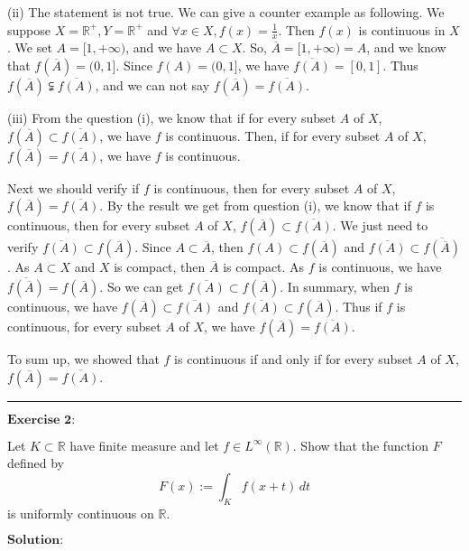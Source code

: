\documentclass[12pt,a4paper]{ctexart}
\begin{document}
(ii) The statement is not true. We can give a counter example as following. We suppose $X = \mathbb{R}^{+}, Y = \mathbb{R}^{+}$ and $\forall x \in X, f(x) = \frac{1}{x}$. Then $f(x)$ is continuous in $X$. We set $A = [1, + \infty)$, and we have $A \subset X$. So, $\overline{A} = [1, + \infty) = A$, and we know that $f(\overline{A}) = (0, 1]$. Since $f(A) = (0, 1]$, we have $\overline{f(A)} = [0, 1]$. Thus $f(\overline{A}) \subsetneqq \overline{f(A)}$, and we can not say $f(\overline{A}) = \overline{f(A)}$.

(iii) From the question (i), we know that if for every subset $A$ of $X$, $f(\overline{A}) \subset  \overline{f(A)}$, we have $f$ is continuous. Then, if for every subset $A$ of $X$, $f(\overline{A}) = \overline{f(A)}$, we have $f$ is continuous. 

Next we should verify if $f$ is continuous, then for every subset $A$ of $X$, $f(\overline{A}) = \overline{f(A)}$. By the result we get from question (i), we know that if $f$ is continuous, then for every subset $A$ of $X$, $f(\overline{A}) \subset  \overline{f(A)}$. We just need to verify $\overline{f(A)} \subset  f(\overline{A})$. Since $A \subset \overline{A}$, then $f(A) \subset f(\overline{A})$ and $\overline{f(A)} \subset \overline{f(\overline{A})}$. As $A \subset X$ and $X$ is compact, then $\overline{A}$ is compact. As $f$ is continuous, we have $\overline{f(\overline{A})} = f(\overline{A})$. So we can get $\overline{f(A)} \subset  f(\overline{A})$. In summary, when $f$ is continuous, we have $f(\overline{A}) \subset  \overline{f(A)}$ and $\overline{f(A)} \subset  f(\overline{A})$. Thus if $f$ is continuous, for every subset $A$ of $X$, we have $f(\overline{A}) = \overline{f(A)}$.

To sum up, we showed that $f$ is continuous if and only if for every subset $A$ of $X$, $f(\overline{A}) = \overline{f(A)}$.


\noindent\rule[0.25\baselineskip]{\textwidth}{0.5pt}

\vspace{8pt}
$\textbf{Exercise 2:}$

Let $K \subset \mathbb{R}$ have finite measure and let $f \in L^{\infty} (\mathbb{R})$. Show that the function $F$ defined by 
\begin{equation*}
   F(x):= \int_{K}^{} f(x + t) \, d t
\end{equation*}
is uniformly continuous on $\mathbb{R}$.

\vspace{8pt}
$\textbf{Solution:}$
\end{document}
